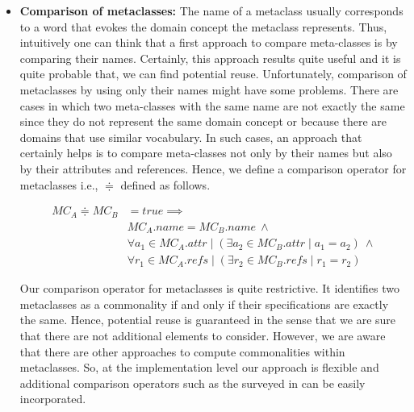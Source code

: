 \begin{itemize}
\item \textbf{Comparison of metaclasses:} The name of a metaclass usually corresponds to a word that evokes the domain concept the metaclass represents. Thus, intuitively one can think that a first approach to compare meta-classes is by comparing their names. Certainly, this approach results quite useful and it is quite probable that, we can find potential reuse. Unfortunately, comparison of metaclasses by using only their names might have some problems. There are cases in which two meta-classes with the same name are not exactly the same since they do not represent the same domain concept or because there are domains that use similar vocabulary. In such cases, an approach that certainly helps is to compare meta-classes not only by their names but also by their attributes and references. Hence, we define a comparison operator for metaclasses i.e., $\doteqdot $ defined as follows.


\begin{equation}
\begin{split}
  MC_{A} \doteqdot MC_{B} &= true \implies \\
   & MC_{A}.name = MC_{B}.name ~ \wedge \\
   & \forall a_1 \in MC_{A}.attr \mid (\exists a_2 \in MC_{B}.attr \mid a_1 = a_2) ~ \wedge \\
   & \forall r_1 \in MC_{A}.refs \mid (\exists r_2 \in MC_{B}.refs \mid r_1 = r_2)
  \end{split}
\end{equation}

\vspace{2mm}
\hspace{3mm} Our comparison operator for metaclasses is quite restrictive. It identifies two metaclasses as a commonality if and only if their specifications are exactly the same. Hence, potential reuse is guaranteed in the sense that we are sure that there are not additional elements to consider. However, we are aware that there are other approaches to compute commonalities within metaclasses. So, at the implementation level our approach is flexible and additional comparison operators such as the surveyed in \cite{Lafi:2011} can be easily incorporated.


\end{itemize}
